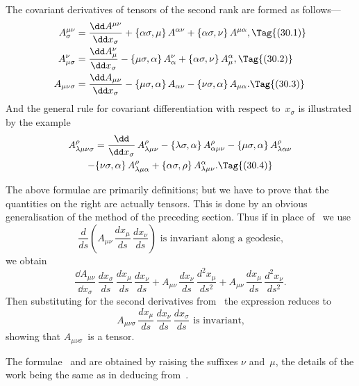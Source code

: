 \documentclass[12pt]{book}
\begin{document}
The covariant derivatives of tensors of the second rank are formed as
follows---
\begin{align*}
  A_{\sigma}^{\mu\nu} &= \frac{\dd A^{\mu\nu}}{\dd x_{\sigma}}
    + \{\alpha\sigma, \mu\}\, A^{\alpha\nu} + \{\alpha\sigma, \nu\}\, A^{\mu\alpha},
\Tag{(30.1)} \\
  A_{\mu\sigma}^{\nu} &= \frac{\dd A_{\mu}^{\nu}}{\dd x_{\sigma}}
    - \{\mu\sigma, \alpha\}\, A_{\alpha}^{\nu} + \{\alpha\sigma, \nu\}\, A_{\mu}^{\alpha},
\Tag{(30.2)} \\
  A_{\mu\nu\sigma} &= \frac{\dd A_{\mu\nu}}{\dd x_{\sigma}}
    - \{\mu\sigma, \alpha\}\, A_{\alpha\nu} - \{\nu\sigma, \alpha\}\, A_{\mu\alpha}.
\Tag{(30.3)}
\end{align*}
And the general rule for covariant differentiation with respect to~$x_{\sigma}$ is
illustrated by the example
\begin{multline*}
  A_{\lambda\mu\nu\sigma}^{\rho}
  = \frac{\dd}{\dd x_{\sigma}}\, A_{\lambda\mu\nu}^{\rho}
  - \{\lambda\sigma, \alpha\}\, A_{\alpha\mu\nu}^{\rho}
  - \{\mu\sigma, \alpha\}\, A_{\lambda\alpha\nu}^{\rho} \\
  - \{\nu\sigma, \alpha\}\, A_{\lambda\mu\alpha}^{\rho}
  + \{\alpha\sigma, \rho\}\, A_{\lambda\mu\nu}^{\alpha}.
  \Tag{(30.4)}
\end{multline*}

The above formulae are primarily definitions; but we have to prove that
the quantities on the right are actually tensors. This is done by an obvious
generalisation of the method of the preceding section. Thus if in place of~
we use
\[
\frac{d}{ds} \left(A_{\mu\nu}\, \frac{dx_{\mu}}{ds}\, \frac{dx_{\nu}}{ds}\right)
\text{ is invariant along a geodesic,}
\]
we obtain
\[
\frac{\dd A_{\mu\nu}}{\dd x_{\sigma}}\, \frac{dx_{\sigma}}{ds}\, \frac{dx_{\mu}}{ds}\, \frac{dx_{\nu}}{ds}
+ A_{\mu\nu}\, \frac{dx_{\nu}}{ds}\, \frac{d^{2}x_{\mu}}{ds^{2}}
+ A_{\mu\nu}\, \frac{dx_{\mu}}{ds}\, \frac{d^{2}x_{\nu}}{ds^{2}}.
\]
Then substituting for the second derivatives from~ the expression
reduces to
\[
A_{\mu\nu\sigma}\, \frac{dx_{\mu}}{ds}\, \frac{dx_{\nu}}{ds}\, \frac{dx_{\sigma}}{ds}
\text{ is invariant,}
\]
showing that $A_{\mu\nu\sigma}$~is a tensor.

The formulae ~and  are obtained by raising the suffixes $\nu$ and~$\mu$,
the details of the work being the same as in deducing  from~.
\end{document}
